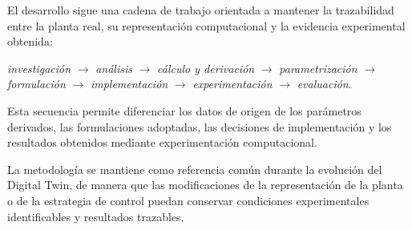 El desarrollo sigue una cadena de trabajo orientada a mantener la trazabilidad entre la planta real, su representación computacional y la evidencia experimental obtenida:

\begin{center}
\textit{investigación}
$\rightarrow$
\textit{análisis}
$\rightarrow$
\textit{cálculo y derivación}
$\rightarrow$
\textit{parametrización}
$\rightarrow$
\textit{formulación}
$\rightarrow$
\textit{implementación}
$\rightarrow$
\textit{experimentación}
$\rightarrow$
\textit{evaluación}.
\end{center}

Esta secuencia permite diferenciar los datos de origen de los parámetros derivados, las formulaciones adoptadas, las decisiones de implementación y los resultados obtenidos mediante experimentación computacional.

La metodología se mantiene como referencia común durante la evolución del Digital Twin, de manera que las modificaciones de la representación de la planta o de la estrategia de control puedan conservar condiciones experimentales identificables y resultados trazables.

